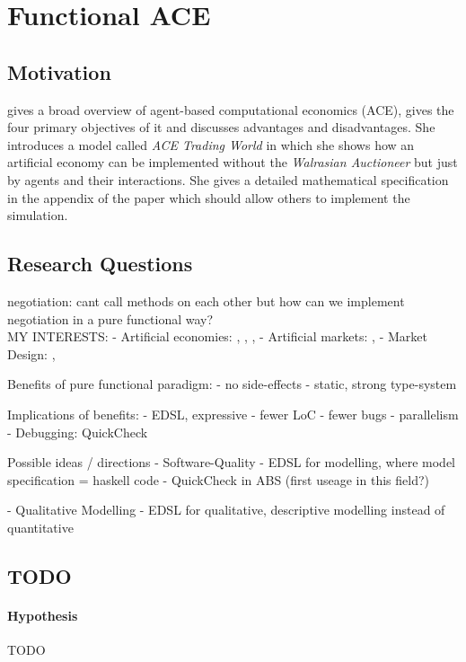 \section{Functional ACE}

\subsection{Motivation}
\cite{tesfatsion_agent-based_2006} gives a broad overview of agent-based computational economics (ACE), gives the four primary objectives of it and discusses advantages and disadvantages. She introduces a model called \textit{ACE Trading World} in which she shows how an artificial economy can be implemented without the \textit{Walrasian Auctioneer} but just by agents and their interactions. She gives a detailed mathematical specification in the appendix of the paper which should allow others to implement the simulation.

\subsection{Research Questions}

negotiation: cant call methods on each other but how can we implement negotiation in a pure functional way?\\

MY INTERESTS:
- Artificial economies: \cite{tesfatsion_agent-based_2006}, \cite{gintis_emergence_2006}, \cite{gintis_dynamics_2007}, \cite{gaffeo_adaptive_2008}
- Artificial markets: \cite{mackie-mason_chapter_2006}, \cite{darley_nasdaq_2007}
- Market Design: \cite{marks_chapter_2006}, \cite{budish_editors_2015}

Benefits of pure functional paradigm:
- no side-effects
- static, strong type-system

Implications of benefits:
- EDSL, expressive
- fewer LoC
- fewer bugs
- parallelism
- Debugging: QuickCheck

Possible ideas / directions
- Software-Quality
	- EDSL for modelling, where model specification = haskell code
	- QuickCheck in ABS (first useage in this field?)

- Qualitative Modelling
	- EDSL for qualitative, descriptive modelling instead of quantitative

\subsection{TODO}
\paragraph{Hypothesis} TODO
